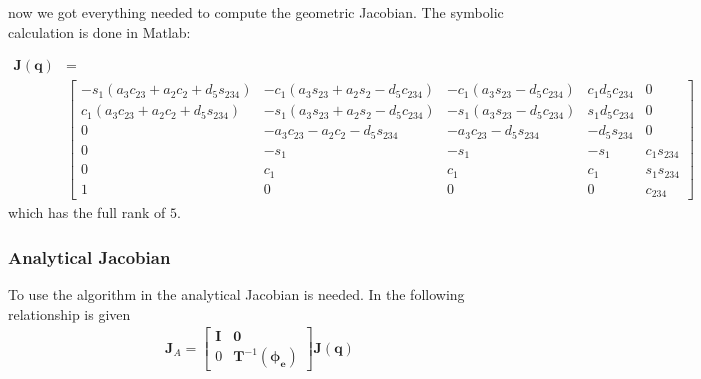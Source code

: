 now we got everything needed to compute the geometric Jacobian. The symbolic calculation is done in Matlab:


\begin{align*}
    \bm{J}(\bm{q}) &= \\
    &\begin{bmatrix}
        -s_1(a_3c_{23} + a_2c_{2} + d_5s_{234}) & 
        -c_1(a_3s_{23} + a_2s_{2} - d_5c_{234}) & 
        -c_1(a_3s_{23} - d_5c_{234})            & 
        c_1d_5c_{234}                           & 
        0\\
        c_1(a_3c_{23} + a_2c_{2} + d_5s_{234})  & 
        -s_1(a_3s_{23} + a_2s_{2} - d_5c_{234}) & 
        -s_1(a_3s_{23} - d_5c_{234})            & 
        s_1d_5c_{234}                           & 
        0\\
        0                                       &
        -a_3c_{23}- a_2c_2 - d_5s_{234}         &
        -a_3c_{23} - d_5s_{234}                 &
        -d_5s_{234}                             &
        0\\
        0                                       &
        -s_1                                    &
        -s_1                                    &
        -s_1                                    &
        c_1s_{234}\\
        0                                       &
        c_1&
        c_1&
        c_1&
        s_1s_{234}\\
        1& 0 & 0 & 0 & c_{234}
    \end{bmatrix}
\end{align*}
which has the full rank of $5$. 
\subsubsection*{Analytical Jacobian}
To use the algorithm in  the analytical Jacobian is needed. In \cite{Siciliano} the following relationship is given
\begin{align*}
    \bm{J}_A =
    \begin{bmatrix}
        \bm{I} & \bm{0}\\ 0 & \bm{T}^{-1}(\bm{\phi_e})
    \end{bmatrix}
    \bm{J}(\bm{q})
\end{align*}

